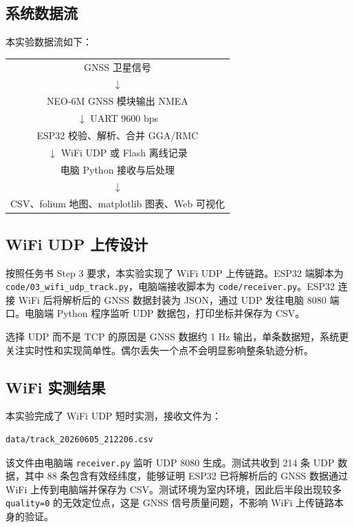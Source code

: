 \documentclass[UTF8,a4paper,12pt]{ctexart}
\begin{document}
\subsection{系统数据流}
本实验数据流如下：

\begin{center}
\begin{tabular}{c}
GNSS 卫星信号 \\
$\downarrow$ \\
NEO-6M GNSS 模块输出 NMEA \\
$\downarrow$ UART 9600 bps \\
ESP32 校验、解析、合并 GGA/RMC \\
$\downarrow$ WiFi UDP 或 Flash 离线记录 \\
电脑 Python 接收与后处理 \\
$\downarrow$ \\
CSV、folium 地图、matplotlib 图表、Web 可视化 \\
\end{tabular}
\end{center}

\subsection{WiFi UDP 上传设计}
按照任务书 Step 3 要求，本实验实现了 WiFi UDP 上传链路。ESP32 端脚本为 \verb|code/03_wifi_udp_track.py|，电脑端接收脚本为 \verb|code/receiver.py|。ESP32 连接 WiFi 后将解析后的 GNSS 数据封装为 JSON，通过 UDP 发往电脑 8080 端口。电脑端 Python 程序监听 UDP 数据包，打印坐标并保存为 CSV。

选择 UDP 而不是 TCP 的原因是 GNSS 数据约 1 Hz 输出，单条数据短，系统更关注实时性和实现简单性。偶尔丢失一个点不会明显影响整条轨迹分析。

\subsection{WiFi 实测结果}
本实验完成了 WiFi UDP 短时实测，接收文件为：

\begin{lstlisting}
data/track_20260605_212206.csv
\end{lstlisting}

该文件由电脑端 \verb|receiver.py| 监听 UDP 8080 生成。测试共收到 214 条 UDP 数据，其中 88 条包含有效经纬度，能够证明 ESP32 已将解析后的 GNSS 数据通过 WiFi 上传到电脑端并保存为 CSV。测试环境为室内环境，因此后半段出现较多 \verb|quality=0| 的无效定位点，这是 GNSS 信号质量问题，不影响 WiFi 上传链路本身的验证。
\end{document}
